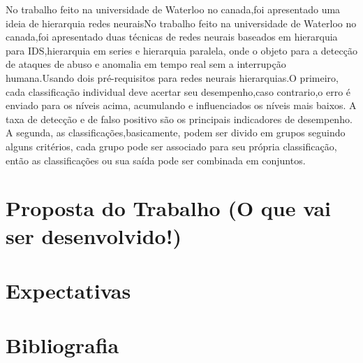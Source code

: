 \documentclass[
	12pt,				%
	openright,			%
	oneside,
	a4paper,			%
	english,			%
	french,				%
	spanish,			%
	brazil				%
	]{abntex2}
\begin{document}
No trabalho feito na universidade de Waterloo no canada\cite{Chunlin},foi apresentado uma ideia de hierarquia redes neuraisNo trabalho feito na universidade de Waterloo no canada\cite{Chunlin},foi apresentado duas técnicas de redes neurais baseados em hierarquia para IDS,hierarquia em series e hierarquia paralela, onde o objeto para a detecção de ataques de abuso e anomalia em tempo real sem a interrupção humana.Usando dois pré-requisitos para redes neurais hierarquias.O primeiro, cada classificação individual deve acertar seu desempenho,caso contrario,o erro é enviado para os níveis acima, acumulando e influenciados os níveis mais baixos. A taxa de detecção e de falso positivo são os principais indicadores de desempenho. A segunda, as classificações,basicamente, podem ser divido em grupos seguindo alguns critérios, cada grupo pode ser associado para seu própria classificação, então as classificações ou sua saída pode ser combinada em conjuntos.
\chapter[Proposta do Trabalho]{Proposta do Trabalho (O que vai ser desenvolvido!)}


\chapter[Expectativas]{Expectativas}



\postextual

\chapter[Bibliografia]{Bibliografia}




\end{document}
